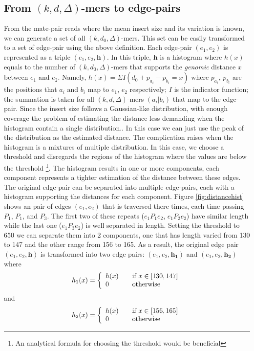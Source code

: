 \documentclass[12pt,a4paper,oneside]{article}
\begin{document}
\subsection{From $(k,d, \Delta)$-mers to edge-pairs}

From the mate-pair reads where the mean insert size and its variation is known, we can generate a set of all $(k,d_0,\Delta)$-mers. This set can be easily transformed to 
a set of edge-pair using the above definition. Each edge-pair $(e_1,e_2)$ is represented as a triple $(e_1,e_2,\mathbf{h})$. In this triple, $\mathbf{h}$ is a 
histogram where $h(x)$ equals to the number of $(k,d_0,\Delta)$-mers that supports the \emph{genomic} distance $x$ between $e_1$ and $e_2$.
Namely, $h(x) = \Sigma I( d_0 +  p_{a_i} - p_{b_i} = x) $ where $p_{a_i}$, $p_{b_i}$ are
the positions that $a_i$ and $b_i$ map to $e_1$, $e_2$ respectively; $I$ is the indicator function; the summation is taken for all  $(k,d,\Delta)$-mers $(a_i|b_i)$ that 
 map  to  the edge-pair. Since the insert size follows a Gaussian-like distribution, with enough coverage the problem of estimating the distance less demanding  when 
the histogram contain a single distribution.. In this case
we can just use the peak of the distribution as the estimated distance. The complication raises when the histogram is a mixtures of  multiple distribution. In this case,
we choose a threshold and disregards the regions of the histogram where the values are below the threshold \footnote{An analytical formula for choosing the threshold 
would be beneficial}. The histogram results in one or more components, each component represents a tighter estimation of the distance between these edges. The original edge-pair
can be separated into multiple edge-pairs, each with a histogram supporting the distances for each component. Figure \ref{fig:distancehist}
shows an pair of edges $(e_1,e_2)$ that is traversed there times, each time passing $P_1$, $P_1$, and $P_3$. The first two of these repeats ($e_1 P_1 e_2$, $e_1 P_2 e_2$) have
similar length while  the last one ($e_1 P_3 e_2$) is well separated in length. Setting the threshold to 650 we can separate them into 2 components, one that has length 
varied from 130 to 147 and the other range from 156 to 165.  As a result, the original edge pair $(e_1, e_2,\mathbf{h})$ is transformed into two edge pairs: 
$(e_1,e_2,\mathbf{h_1})$ and $(e_1,e_2, \mathbf{h_2})$ where 
\[
h_1(x) = \left\{ 
\begin{array}{l l}
h(x) & \quad \text{if $x \in [130, 147]$}\\
0    & \quad \text{otherwise}\\
\end{array} \right.
\]
and 
\[
h_2(x) = \left\{ 
\begin{array}{l l}
h(x) & \quad \text{if $x \in [156, 165]$}\\
0    & \quad \text{otherwise}\\
\end{array} \right.
\]
\end{document}
